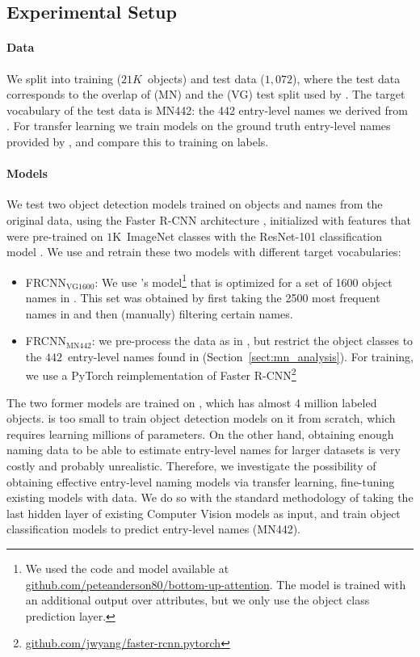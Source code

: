 \subsection{Experimental Setup}
\label{sect:exp_setup}

\paragraph{Data}
We split \mn into training ($21K$~objects) and test data ($1,072$), where the test data corresponds to the overlap of \mn (MN) and the \vg (VG) test split used by  . 
The target vocabulary of the test data is MN442: the 442 entry-level names we derived from \mn. %
For transfer learning we train models on the ground truth entry-level names provided by \mn, and compare this to training on \vg labels. 

\paragraph{Models}
We test two object detection models trained on objects and names from the original \vg data, using the Faster R-CNN architecture \cite{fasterrcnn2015}, initialized with features that were pre-trained on $1$K~ImageNet classes with the ResNet-101 classification model \cite{he2016deep}.
We use and retrain these two models with different target vocabularies:

\begin{itemize}
\item FRCNN$_{\text{VG1600}}$: We use \citep{anderson2018updown}'s model\footnote{We used the code and model available at  \url{github.com/peteanderson80/bottom-up-attention}. The model is trained with an additional output over attributes, but we only use the object class prediction layer.} that is optimized for a set of 1600 object names in \vg. This set was obtained by first taking the 2500 most frequent names in \vg and then (manually) filtering certain names.
 \item  FRCNN$_{\text{MN442}}$: we pre-process the \vg data as in \citeauthor{anderson2018updown}, but restrict the object classes to the $442$~entry-level names found in \mn (Section~\ref{sect:mn_analysis}). 
For training, we use a PyTorch reimplementation of Faster R-CNN\footnote{\url{github.com/jwyang/faster-rcnn.pytorch}}
\end{itemize}

The two former models are trained on \vg, which has almost 4 million labeled objects.
\mn is too small to train object detection models on it from scratch, which requires learning millions of parameters.
On the other hand, obtaining enough naming data to be able to estimate entry-level names for larger datasets is very costly and probably unrealistic.
Therefore, we investigate the possibility of obtaining effective entry-level naming models via transfer learning, fine-tuning existing models with \mn data.
We do so with the standard methodology of taking the last hidden layer of existing Computer Vision models as input, and train object classification models to predict entry-level names (MN442).

